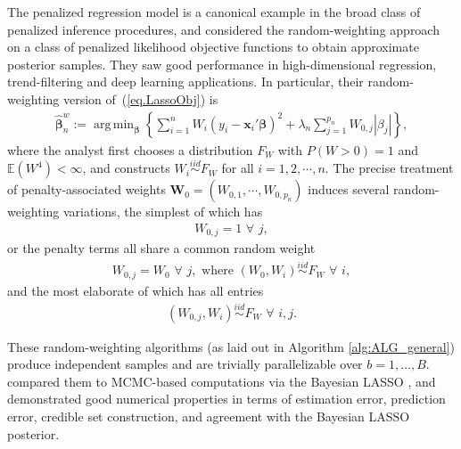\documentclass[ejs,authoryear,linksfromyear]{imsart}
\DeclareMathOperator*{\argmin}{arg\,min} %
\newcommand{\sumin}{\sum_{i=1}^n} %
\newcommand{\bnw}{\widehat{\bm{\beta}}_n^w} %
\numberwithin{equation}{section}
\theoremstyle{plain}
\begin{document}
The penalized regression model is a canonical example
in the broad class of penalized inference procedures, and \citet{WBB} considered the random-weighting approach on a class of penalized likelihood objective functions to obtain approximate posterior samples. They saw good performance 
in high-dimensional regression, trend-filtering and deep learning applications. In particular, their random-weighting version of~(\ref{eq.LassoObj}) is
\begin{align} \label{eq.Bnw.setup}
\bnw := \argmin_{\bm{\beta}}
\left\{
\sumin W_i ( y_i - \bm{x}_i' \bm{\beta} )^2 
+ \lambda_n \sum_{j=1}^{p_n} W_{0,j} |\beta_j|
\right\}, 
\end{align}      
where the analyst first chooses a distribution $F_W$ with $P(W>0) = 1$ and $\mathbb{E}(W^4) < \infty$, and constructs $W_i \stackrel{iid}{\sim} F_W$ for all $i = 1, 2, \cdots, n$. 
The precise treatment of penalty-associated weights $\bm{W}_0=(W_{0,1}, \cdots, W_{0,p_n})$ induces several random-weighting variations, the simplest of which has 
\begin{align} \label{eq.NoWeightPenalty}
W_{0,j} = 1 \,\, \forall \,\, j,
\end{align}
or the penalty terms all share a common random weight
\begin{align} \label{eq.Bnw.WeightPenalty}
W_{0,j} = W_0 \,\, \forall \,\, j,
\text{ where } (W_0, W_i )\stackrel{iid}{\sim} F_W
\,\, \forall \,\, i,
\end{align}
and the most elaborate of which has all entries
\begin{align} \label{eq.Bnw.WeightPenalty2}
(W_{0,j}, W_i) \stackrel{iid}{\sim} F_W \,\, \forall \,\, i,j.
\end{align}

These random-weighting algorithms (as laid out in Algorithm \ref{alg:ALG_general}) produce independent samples and are trivially parallelizable over $b= 1, \ldots, B$. \citet{WBB} compared them to MCMC-based computations via  the Bayesian LASSO \citep{BayesianLasso}, and demonstrated  good numerical properties in terms of estimation error, prediction error, credible set construction, and  agreement with the Bayesian LASSO posterior. 
\end{document}
